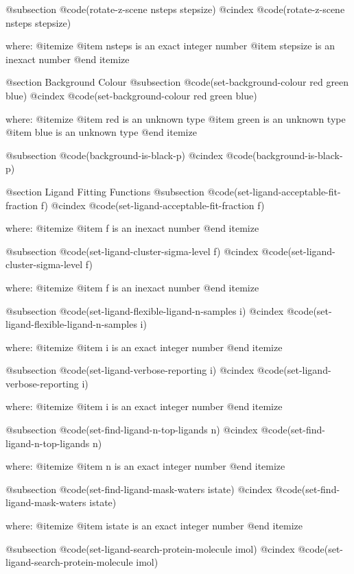 @subsection @code{(rotate-z-scene nsteps stepsize)}
@cindex @code{(rotate-z-scene nsteps stepsize)}
 
where: 
 @itemize 
     @item nsteps is an exact integer number
     @item stepsize is an inexact number
 @end itemize



@section Background Colour 
@subsection @code{(set-background-colour red green blue)}
@cindex @code{(set-background-colour red green blue)}
 
where: 
 @itemize 
     @item red is an unknown type
     @item green is an unknown type
     @item blue is an unknown type
 @end itemize


@subsection @code{(background-is-black-p)}
@cindex @code{(background-is-black-p)}
 

@section Ligand Fitting Functions 
@subsection @code{(set-ligand-acceptable-fit-fraction f)}
@cindex @code{(set-ligand-acceptable-fit-fraction f)}
 
where: 
 @itemize 
     @item f is an inexact number
 @end itemize


@subsection @code{(set-ligand-cluster-sigma-level f)}
@cindex @code{(set-ligand-cluster-sigma-level f)}
 
where: 
 @itemize 
     @item f is an inexact number
 @end itemize


@subsection @code{(set-ligand-flexible-ligand-n-samples i)}
@cindex @code{(set-ligand-flexible-ligand-n-samples i)}
 
where: 
 @itemize 
     @item i is an exact integer number
 @end itemize


@subsection @code{(set-ligand-verbose-reporting i)}
@cindex @code{(set-ligand-verbose-reporting i)}
 
where: 
 @itemize 
     @item i is an exact integer number
 @end itemize


@subsection @code{(set-find-ligand-n-top-ligands n)}
@cindex @code{(set-find-ligand-n-top-ligands n)}
 
where: 
 @itemize 
     @item n is an exact integer number
 @end itemize


@subsection @code{(set-find-ligand-mask-waters istate)}
@cindex @code{(set-find-ligand-mask-waters istate)}
 
where: 
 @itemize 
     @item istate is an exact integer number
 @end itemize


@subsection @code{(set-ligand-search-protein-molecule imol)}
@cindex @code{(set-ligand-search-protein-molecule imol)}
 
